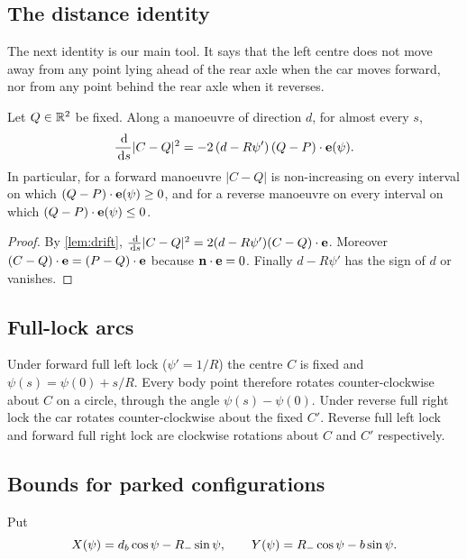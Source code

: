 \subsection{The distance identity}
The next identity is our main tool.
It says that the left centre does not move away from any point lying ahead of the rear axle when the car moves forward, nor from any point behind the rear axle when it reverses.

\begin{lemma}\label{lem:distance}
Let $Q\in\mathbb{R}^2$ be fixed.
Along a manoeuvre of direction $d$, for almost every $s$,
\[
  \frac{\,\mathrm{d}}{\,\mathrm{d} s}|C-Q|^2=-2\,(d-R\psi')\,(Q-P)\cdot\mathbf{e}(\psi).
\]
In particular, for a forward manoeuvre $|C-Q|$ is non-increasing on every interval on which $(Q-P)\cdot\mathbf{e}(\psi)\ge0$, and for a reverse manoeuvre on every interval on which $(Q-P)\cdot\mathbf{e}(\psi)\le0$.
\end{lemma}
\begin{proof}
By \cref{lem:drift}, $\frac{\,\mathrm{d}}{\,\mathrm{d} s}|C-Q|^2=2(d-R\psi')(C-Q)\cdot\mathbf{e}$.
Moreover $(C-Q)\cdot\mathbf{e}=(P-Q)\cdot\mathbf{e}$ because $\mathbf{n}\cdot\mathbf{e}=0$.
Finally $d-R\psi'$ has the sign of $d$ or vanishes.
\end{proof}

\subsection{Full-lock arcs}
Under forward full left lock ($\psi'=1/R$) the centre $C$ is fixed and $\psi(s)=\psi(0)+s/R$.
Every body point therefore rotates counter-clockwise about $C$ on a circle, through the angle $\psi(s)-\psi(0)$.
Under reverse full right lock the car rotates counter-clockwise about the fixed $C'$.
Reverse full left lock and forward full right lock are clockwise rotations about $C$ and $C'$ respectively.

\subsection{Bounds for parked configurations}
Put
\[
  X(\psi)=d_b\cos\psi-R_{-}\sin\psi,\qquad Y(\psi)=R_{-}\cos\psi-b\sin\psi .
\]

